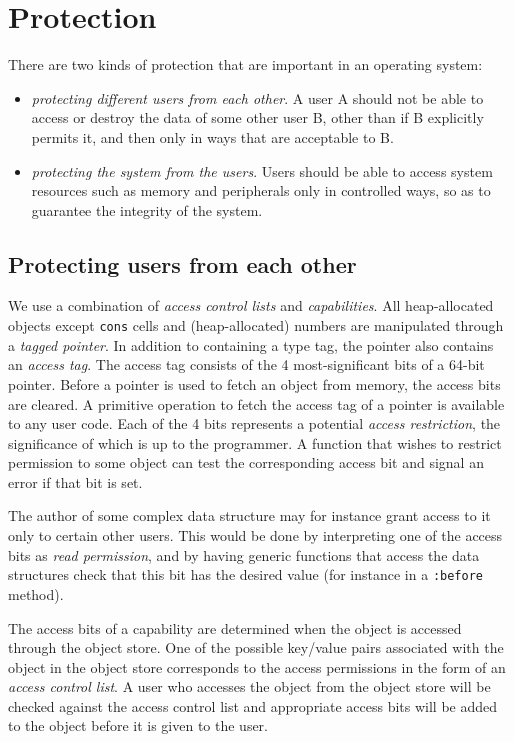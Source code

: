 \chapter{Protection}
\label{chap-protection}

There are two kinds of protection that are important in an operating
system:

\begin{itemize}
\item \emph{protecting different users from each other}.  A user A
  should not be able to access or destroy the data of some other user
  B, other than if B explicitly permits it, and then only in ways that
  are acceptable to B.
\item \emph{protecting the system from the users}.  Users should be
  able to access system resources such as memory and peripherals only
  in controlled ways, so as to guarantee the integrity of the system.
\end{itemize}

\section{Protecting users from each other}

We use a combination of \emph{access control lists} and
\emph{capabilities}.  All heap-allocated objects except \texttt{cons}
cells and (heap-allocated) numbers are manipulated through a
\emph{tagged pointer}.  In addition to containing a type tag, the
pointer also contains an \emph{access tag}.  The access tag consists
of the 4 most-significant bits of a 64-bit pointer.  Before a pointer
is used to fetch an object from memory, the access bits are cleared.
A primitive operation to fetch the access tag of a pointer is
available to any user code.  Each of the 4 bits represents a potential
\emph{access restriction}, the significance of which is up to the
programmer.  A function that wishes to restrict permission to some
object can test the corresponding access bit and signal an error if
that bit is set.

The author of some complex data structure may for instance grant
access to it only to certain other users.  This would be done by
interpreting one of the access bits as \emph{read permission}, and by
having generic functions that access the data structures check that
this bit has the desired value (for instance in a \texttt{:before}
method). 

The access bits of a capability are determined when the object is
accessed through the object store.   One of
the possible key/value pairs associated with the object in the object
store corresponds to the access permissions in the form of an
\emph{access control list}.  A user who accesses the object from the
object store will be checked against the access control list and
appropriate access bits will be added to the object before it is given
to the user.  

